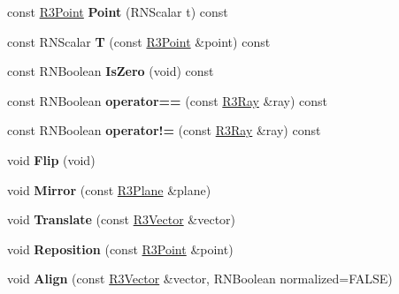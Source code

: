 \begin{DoxyCompactItemize}
\item 
const \hyperlink{class_r3_point}{R3\+Point} {\bfseries Point} (R\+N\+Scalar t) const \hypertarget{class_r3_ray_a712eb6c33c36c15fa1ea3898eee338af}{}\label{class_r3_ray_a712eb6c33c36c15fa1ea3898eee338af}

\item 
const R\+N\+Scalar {\bfseries T} (const \hyperlink{class_r3_point}{R3\+Point} \&point) const \hypertarget{class_r3_ray_a2c032240abb649cb0a1d7cced81fee7f}{}\label{class_r3_ray_a2c032240abb649cb0a1d7cced81fee7f}

\item 
const R\+N\+Boolean {\bfseries Is\+Zero} (void) const \hypertarget{class_r3_ray_ac5a297082cd4e65d342102de26b3faf6}{}\label{class_r3_ray_ac5a297082cd4e65d342102de26b3faf6}

\item 
const R\+N\+Boolean {\bfseries operator==} (const \hyperlink{class_r3_ray}{R3\+Ray} \&ray) const \hypertarget{class_r3_ray_a07d2ab3f89f1b30533507a72f3c3c9ef}{}\label{class_r3_ray_a07d2ab3f89f1b30533507a72f3c3c9ef}

\item 
const R\+N\+Boolean {\bfseries operator!=} (const \hyperlink{class_r3_ray}{R3\+Ray} \&ray) const \hypertarget{class_r3_ray_a216309f694c0eff5f7aa2d2833a7f150}{}\label{class_r3_ray_a216309f694c0eff5f7aa2d2833a7f150}

\item 
void {\bfseries Flip} (void)\hypertarget{class_r3_ray_ac269c231a2f94e33babaa4aa267d5771}{}\label{class_r3_ray_ac269c231a2f94e33babaa4aa267d5771}

\item 
void {\bfseries Mirror} (const \hyperlink{class_r3_plane}{R3\+Plane} \&plane)\hypertarget{class_r3_ray_ab3d53784fab8d8af809ce1db931ac940}{}\label{class_r3_ray_ab3d53784fab8d8af809ce1db931ac940}

\item 
void {\bfseries Translate} (const \hyperlink{class_r3_vector}{R3\+Vector} \&vector)\hypertarget{class_r3_ray_af31c33334ce36487196e3c63dd761366}{}\label{class_r3_ray_af31c33334ce36487196e3c63dd761366}

\item 
void {\bfseries Reposition} (const \hyperlink{class_r3_point}{R3\+Point} \&point)\hypertarget{class_r3_ray_a0582d49ef4ded5ca39cd66d3e9305340}{}\label{class_r3_ray_a0582d49ef4ded5ca39cd66d3e9305340}

\item 
void {\bfseries Align} (const \hyperlink{class_r3_vector}{R3\+Vector} \&vector, R\+N\+Boolean normalized=F\+A\+L\+SE)\hypertarget{class_r3_ray_a714925d62cbed8be5b5ce27b031a6355}{}\label{class_r3_ray_a714925d62cbed8be5b5ce27b031a6355}


\end{DoxyCompactItemize}
